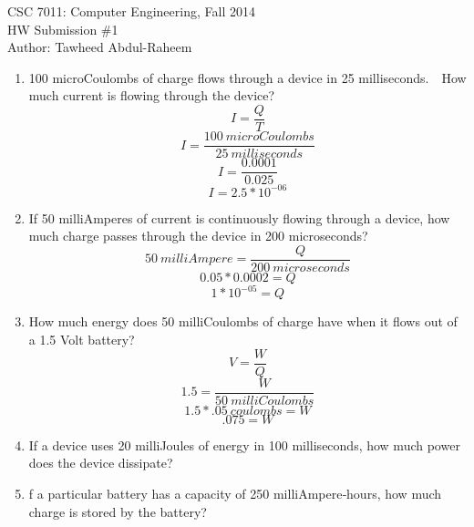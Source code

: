 \documentclass[12pt]{article}
\begin{document}
\begin{center}
  CSC 7011: Computer Engineering, Fall 2014\\
  HW Submission \#1 \\
  Author: Tawheed Abdul-Raheem
\end{center}

\smallskip

\begin{enumerate}

  \item 100 microCoulombs of charge flows through a device in 25 milliseconds.  How much current is
    flowing through the device? \\
    \[ I = \frac{Q}{T} \]
    \[ I = \frac{100 \: microCoulombs}{25 \: milliseconds} \]
    \[ I = \frac{0.0001}{0.025} \]
    \[ I = 2.5 * 10 ^ {-06}\]
  \item If 50 milliAmperes of current is continuously flowing through a device, how much charge passes
    through the device in 200 microseconds?
    \[ 50 \: milliAmpere = \frac{Q}{200 \: microseconds} \]
    \[ 0.05 * 0.0002 = Q \]
    \[ 1 * 10 ^ {-05}  = Q\] 
  \item How much energy does 50 milliCoulombs of charge have when it flows out of a 1.5 Volt battery?
    \[ V = \frac{W}{Q} \]
    \[ 1.5 = \frac{W}{50 \: milliCoulombs } \]
    \[ 1.5 * .05 \: coulombs = W \]
    \[ .075 = W \]
  \item If a device uses 20 milliJoules of energy in 100 milliseconds, how much power does the device
    dissipate?
  \item f a particular battery has a capacity of 250 milliAmpere‐hours, how much charge is stored by
    the battery?
\end{enumerate}
\end{document}
